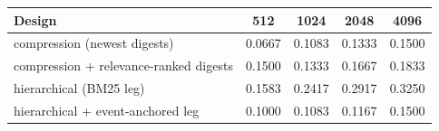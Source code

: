 \begin{tabular}{lcccc}
\toprule
Design & 512 & 1024 & 2048 & 4096 \\
\midrule
compression (newest digests) & 0.0667 & 0.1083 & 0.1333 & 0.1500 \\
compression + relevance-ranked digests & 0.1500 & 0.1333 & 0.1667 & 0.1833 \\
hierarchical (BM25 leg) & 0.1583 & 0.2417 & 0.2917 & 0.3250 \\
hierarchical + event-anchored leg & 0.1000 & 0.1083 & 0.1167 & 0.1500 \\
\bottomrule
\end{tabular}
